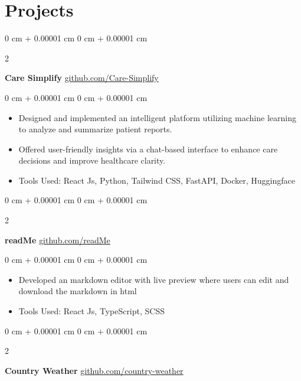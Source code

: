 \documentclass[10pt, letterpaper]{article}
\newenvironment{highlights}{
    \begin{itemize}[
        topsep=0.10 cm,
        parsep=0.10 cm,
        partopsep=0pt,
        itemsep=0pt,
        leftmargin=0 cm + 10pt
    ]
}{
    \end{itemize}
} %
\newenvironment{onecolentry}{
    \begin{adjustwidth}{
        0 cm + 0.00001 cm
    }{
        0 cm + 0.00001 cm
    }
}{
    \end{adjustwidth}
} %
\newenvironment{twocolentry}[2][]{
    \onecolentry
    \def\secondColumn{#2}
    \setcolumnwidth{\fill, 4.5 cm}
    \begin{paracol}{2}
}{
    \switchcolumn \raggedleft \secondColumn
    \end{paracol}
    \endonecolentry
} %
\begin{document}
    \section{Projects}


        \begin{twocolentry}{
            \href{https://github.com/glunkad/Care-Simplify}{github.com/Care-Simplify}
        }
            \textbf{Care Simplify}\end{twocolentry}

        \vspace{0.10 cm}
        \begin{onecolentry}
            \begin{highlights}
                \item Designed and implemented an intelligent platform utilizing machine learning to analyze and summarize patient reports.
                \item Offered user-friendly insights via a chat-based interface to enhance care decisions and improve healthcare clarity.
                \item Tools Used: React Js, Python, Tailwind CSS, FastAPI, Docker, Huggingface
            \end{highlights}
        \end{onecolentry}


        \vspace{0.2 cm}

        
        \begin{twocolentry}{
            \href{https://github.com/glunkad/readMe}{github.com/readMe}
        }
            \textbf{readMe}\end{twocolentry}

        \vspace{0.10 cm}
        \begin{onecolentry}
            \begin{highlights}
                \item Developed an markdown editor with live preview where users can edit and download the markdown in html
                \item Tools Used: React Js, TypeScript, SCSS
            \end{highlights}
        \end{onecolentry}


        \vspace{0.2 cm}

        \begin{twocolentry}{
            \href{https://github.com/glunkad/fullstackopen/tree/main/part2/countryinfo/src}{github.com/country-weather}
        }
            \textbf{Country Weather}\end{twocolentry}
\end{document}
